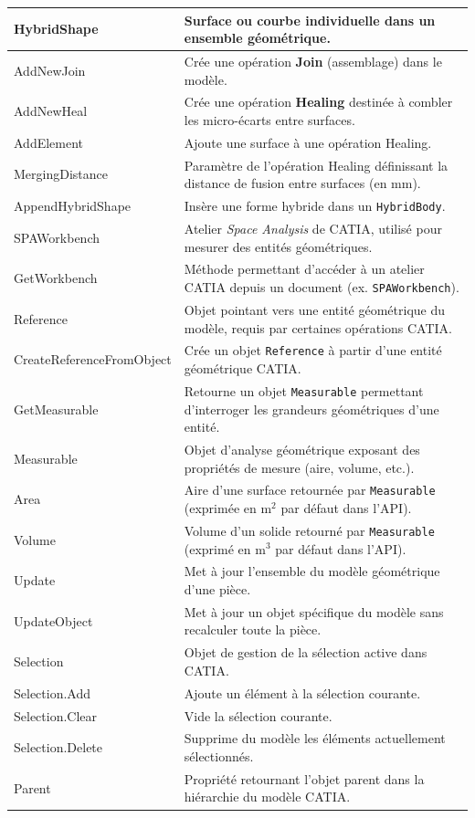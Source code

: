 \begin{longtable}{|>{\ttfamily}p{4.5cm}|p{11.5cm}|}
  HybridShape & Surface ou courbe individuelle dans un ensemble géométrique. \\ \hline
  AddNewJoin & Crée une opération \textbf{Join} (assemblage) dans le modèle. \\ \hline
  AddNewHeal & Crée une opération \textbf{Healing} destinée à combler les micro-écarts entre surfaces. \\ \hline
  AddElement & Ajoute une surface à une opération Healing. \\ \hline
  MergingDistance & Paramètre de l'opération Healing définissant la distance de fusion entre surfaces (en mm). \\ \hline
  AppendHybridShape & Insère une forme hybride dans un \normalfont\texttt{HybridBody}. \\ \hline
  SPAWorkbench & Atelier \textit{Space Analysis} de CATIA, utilisé pour mesurer des entités géométriques. \\ \hline
  GetWorkbench & Méthode permettant d'accéder à un atelier CATIA depuis un document (ex. \normalfont\texttt{SPAWorkbench}). \\ \hline
  Reference & Objet pointant vers une entité géométrique du modèle, requis par certaines opérations CATIA. \\ \hline
  CreateReferenceFromObject & Crée un objet \normalfont\texttt{Reference} à partir d'une entité géométrique CATIA. \\ \hline
  GetMeasurable & Retourne un objet \normalfont\texttt{Measurable} permettant d'interroger les grandeurs géométriques d'une entité. \\ \hline
  Measurable & Objet d'analyse géométrique exposant des propriétés de mesure (aire, volume, etc.). \\ \hline
  Area & Aire d'une surface retournée par \normalfont\texttt{Measurable} (exprimée en m$^{2}$ par défaut dans l'API). \\ \hline
  Volume & Volume d'un solide retourné par \normalfont\texttt{Measurable} (exprimé en m$^{3}$ par défaut dans l'API). \\ \hline
  Update & Met à jour l'ensemble du modèle géométrique d'une pièce. \\ \hline
  UpdateObject & Met à jour un objet spécifique du modèle sans recalculer toute la pièce. \\ \hline
  Selection & Objet de gestion de la sélection active dans CATIA. \\ \hline
  Selection.Add & Ajoute un élément à la sélection courante. \\ \hline
  Selection.Clear & Vide la sélection courante. \\ \hline
  Selection.Delete & Supprime du modèle les éléments actuellement sélectionnés. \\ \hline
  Parent & Propriété retournant l'objet parent dans la hiérarchie du modèle CATIA. \\
  \hline
\end{longtable}